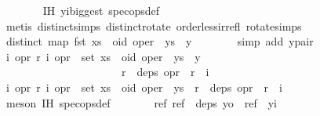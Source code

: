 \begin{isabellebody}
\ \ \ \ \ \ \isamarkupfalse%
\ IH\ yi{\isacharunderscore}biggest\ spec{\isacharunderscore}ops{\isacharunderscore}def\isanewline
\ \ \ \ \ \ \isamarkupfalse%
\ {\isacharparenleft}metis\ distinct{\isachardot}simps{\isacharparenleft}{}{\isacharparenright}\ distinct{}{\isacharunderscore}rotate\ order{\isacharunderscore}less{\isacharunderscore}irrefl\ rotate{}{\isachardot}simps{\isacharparenleft}{}{\isacharparenright}{\isacharparenright}\isanewline
\ \ \ \ \isamarkupfalse%
\ {\isachardoublequoteopen}distinct\ {\isacharparenleft}map\ fst\ {\isacharparenleft}xs\ {\isacharat}\ {\isacharbrackleft}{\isacharparenleft}oid{\isacharcomma}\ oper{\isacharparenright}{\isacharbrackright}\ {\isacharat}\ ys\ {\isacharat}\ {\isacharbrackleft}y{\isacharbrackright}{\isacharparenright}{\isacharparenright}{\isachardoublequoteclose}\isanewline
\ \ \ \ \ \ \isamarkupfalse%
\ {\isacharparenleft}simp\ add{\isacharcolon}\ y{\isacharunderscore}pair{\isacharparenright}\isanewline
\ \ \isamarkupfalse%
\isanewline
\ \ \isamarkupfalse%
\ \isamarkupfalse%
\ {\isachardoublequoteopen}{\isasymforall}i\ opr\ r{\isachardot}\ {\isacharparenleft}i{\isacharcomma}\ opr{\isacharparenright}\ {\isasymin}\ set\ {\isacharparenleft}xs\ {\isacharat}\ {\isacharbrackleft}{\isacharparenleft}oid{\isacharcomma}\ oper{\isacharparenright}{\isacharbrackright}\ {\isacharat}\ ys\ {\isacharat}\ {\isacharbrackleft}y{\isacharbrackright}{\isacharparenright}\isanewline
\ \ \ \ \ \ \ \ \ \ \ \ \ \ \ \ \ \ \ \ \ {\isasymand}\ r\ {\isasymin}\ deps\ opr\ {\isasymlongrightarrow}\ r\ {\isacharless}\ i{\isachardoublequoteclose}\isanewline
\ \ \isamarkupfalse%
\ {\isacharminus}\isanewline
\ \ \ \ \isamarkupfalse%
\ {\isachardoublequoteopen}{\isasymforall}i\ opr\ r{\isachardot}\ {\isacharparenleft}i{\isacharcomma}\ opr{\isacharparenright}\ {\isasymin}\ set\ {\isacharparenleft}xs\ {\isacharat}\ {\isacharbrackleft}{\isacharparenleft}oid{\isacharcomma}\ oper{\isacharparenright}{\isacharbrackright}\ {\isacharat}\ ys{\isacharparenright}\ {\isasymand}\ r\ {\isasymin}\ deps\ opr\ {\isasymlongrightarrow}\ r\ {\isacharless}\ i{\isachardoublequoteclose}\isanewline
\ \ \ \ \ \ \isamarkupfalse%
\ {\isacharparenleft}meson\ IH\ spec{\isacharunderscore}ops{\isacharunderscore}def{\isacharparenright}\isanewline
\ \ \ \ \isamarkupfalse%
\ \isamarkupfalse%
\ {\isachardoublequoteopen}{\isasymforall}ref{\isachardot}\ ref\ {\isasymin}\ deps\ yo\ {\isasymlongrightarrow}\ ref\ {\isacharless}\ yi{\isachardoublequoteclose}\isanewline

\end{isabellebody}
